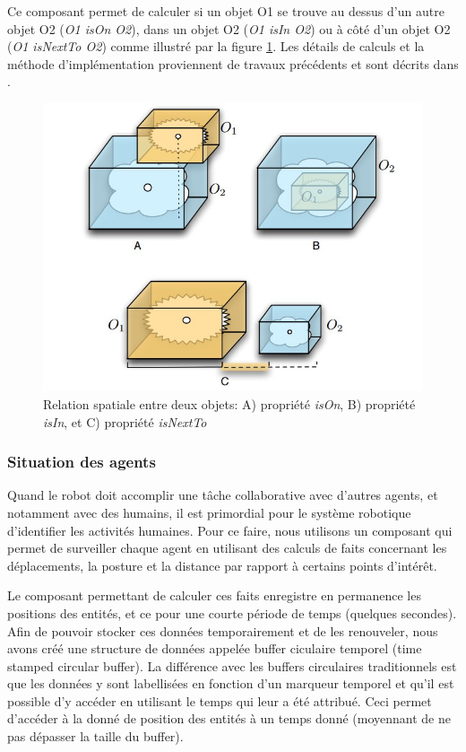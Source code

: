 \documentclass[a4paper,11pt,twoside]{StyleThese}
\begin{document}
Ce composant permet de calculer si un objet O1 se trouve au dessus d'un autre objet O2 (\textit{O1 isOn O2}), dans un objet O2 (\textit{O1 isIn O2}) ou à côté d'un objet O2 (\textit{O1 isNextTo O2}) comme illustré par la figure \ref{fig:spar}. Les détails de calculs et la méthode d'implémentation proviennent de travaux précédents et sont décrits dans \cite{sisbot2011situation}.


\begin{figure}[ht!]
 \centering
  \includegraphics[width=0.5\linewidth]{./img/spar.jpg} 
  \caption {Relation spatiale entre deux objets: A) propriété \textit{isOn}, B) propriété \textit{isIn}, et C) propriété \textit{isNextTo}}
  \label{fig:spar}
\end{figure}


\subsubsection{Situation des agents}
\label{sec:situationAgents}

Quand le robot doit accomplir une tâche collaborative avec d'autres agents, et notamment avec des humains, il est primordial pour le système robotique d'identifier les activités humaines. Pour ce faire, nous utilisons un composant qui permet de surveiller chaque agent en utilisant des calculs de faits concernant les déplacements, la posture et la distance par rapport à certains points d'intérêt.

Le composant permettant de calculer ces faits enregistre en permanence les positions des entités, et ce pour une courte période de temps (quelques secondes). Afin de pouvoir stocker ces données temporairement et de les renouveler, nous avons créé une structure de données appelée buffer ciculaire temporel (time stamped circular buffer). La différence avec les buffers circulaires traditionnels est que les données y sont labellisées en fonction d'un marqueur temporel et qu'il est possible d'y accéder en utilisant le temps qui leur a été attribué. Ceci permet d'accéder à la donné de position des entités à un temps donné (moyennant de ne pas dépasser la taille du buffer).
\end{document}

